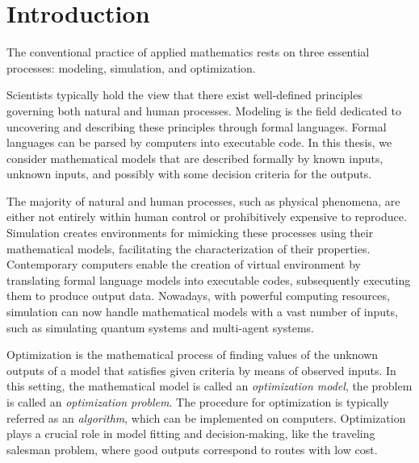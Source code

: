 
\chapter{Introduction}  %


The conventional practice of applied mathematics rests on three essential processes: modeling, simulation, and optimization.

Scientists typically hold the view that there exist well-defined principles governing both natural and human processes. Modeling is the field dedicated to uncovering and describing these principles through formal languages. Formal languages can be parsed by computers into executable code. In this thesis, we consider 
mathematical models that are  described formally by known inputs,  unknown inputs, and possibly with some decision criteria for the outputs.  

The majority of natural and human processes, such as physical phenomena, are either not entirely within human control or prohibitively expensive to reproduce. Simulation creates environments for mimicking these processes using their mathematical models,  facilitating the characterization of their properties. Contemporary computers enable the creation of virtual environment  by translating formal language models into executable codes, subsequently executing them to produce output data.  Nowadays, with powerful computing resources, simulation can now handle mathematical models with a vast number of inputs, such as simulating quantum systems and multi-agent systems.


Optimization is the mathematical process of  finding values of the unknown outputs of a model that satisfies given criteria by means of observed inputs. In this setting, the mathematical model is called an \emph{optimization model}, the problem is called an \emph{optimization problem}. The procedure for optimization is typically referred as an  \emph{algorithm}, which can be implemented on computers. Optimization plays a crucial role in model fitting and decision-making, like the traveling salesman problem, where good outputs correspond to  routes with low cost.


